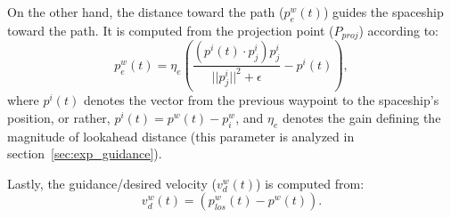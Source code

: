 On the other hand, the distance toward the path ($p^w_e(t)$) guides the spaceship toward the path. It is computed from the projection point ($P_{proj}$) according to:
\begin{equation}
p^w_e(t) = \eta_e \left(    \frac{          (  p^i(t) \cdot p_j^i  )    p_j^i        }{||p_j^i||^2+\epsilon}         -p^i(t)  \right),
\label{eq:guidance_pe}
\end{equation}
where $p^i(t)$ denotes the vector from the previous waypoint to the spaceship's position, or rather, $p^i(t) = p^w(t)-p^w_i$, and $\eta_e$ denotes the gain defining the magnitude of lookahead distance (this parameter is analyzed in section~\ref{sec:exp_guidance}).

Lastly, the guidance/desired velocity ($v_d^w(t)$) is computed from:
\begin{equation}
v^w_d(t) = \left( p^w_{los}(t)-p^w(t) \right).
\label{eq:guidance_velocity}
\end{equation}


